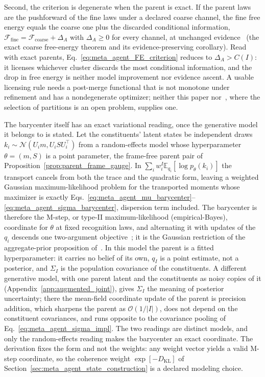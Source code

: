 \documentclass[11pt]{article}
\begin{document}
Second, the criterion is degenerate when the parent is exact. If the parent laws are the pushforward of the fine laws under a declared coarse channel, the fine free energy equals the coarse one plus the discarded conditional information, $\mathcal{F}_{\mathrm{fine}} = \mathcal{F}_{\mathrm{coarse}} + \Delta_A$ with $\Delta_A \ge 0$ for every channel, at unchanged evidence~\cite[Ch.~9]{DennisGaugeVFE2026} (the exact coarse free-energy theorem and its evidence-preserving corollary). Read with exact parents, Eq.~\eqref{eq:meta_agent_FE_criterion} reduces to $\Delta_A > C(I)$: it licenses whichever cluster discards the most conditional information, and the drop in free energy is neither model improvement nor evidence ascent. A usable licensing rule needs a post-merge functional that is not monotone under refinement and has a nondegenerate optimizer; neither this paper nor~\cite[Ch.~9]{DennisGaugeVFE2026}, where the selection of partitions is an open problem, supplies one.

The barycenter itself has an exact variational reading, once the generative model it belongs to is stated. Let the constituents' latent states be independent draws $k_i \sim \mathcal{N}(U_i m, U_i S U_i^\top)$ from a random-effects model whose hyperparameter $\theta = (m, S)$ is a point parameter, the frame-free parent pair of Proposition~\ref{prop:parent_frame_gauge}. In $\sum_i w_i^I \mathbb{E}_{q_i}[\log p_\theta(k_i)]$ the transport cancels from both the trace and the quadratic form, leaving a weighted Gaussian maximum-likelihood problem for the transported moments whose maximizer is exactly Eqs.~\eqref{eq:meta_agent_mu_barycenter}--\eqref{eq:meta_agent_sigma_barycenter}, dispersion term included. The barycenter is therefore the M-step, or type-II maximum-likelihood (empirical-Bayes), coordinate for $\theta$ at fixed recognition laws, and alternating it with updates of the $q_i$ descends one two-argument objective~\cite{Neal1998}; it is the Gaussian restriction of the aggregate-prior proposition of~\cite[Ch.~12]{DennisGaugeVFE2026}. In this model the parent is a fitted hyperparameter: it carries no belief of its own, $q_I$ is a point estimate, not a posterior, and $\Sigma_I$ is the population covariance of the constituents. A different generative model, with one parent latent and the constituents as noisy copies of it (Appendix~\ref{app:augmented_joint}), gives $\Sigma_I$ the meaning of posterior uncertainty; there the mean-field coordinate update of the parent is precision addition, which sharpens the parent as $\mathcal{O}(1/|I|)$, does not depend on the constituent covariances, and runs opposite to the covariance pooling of Eq.~\eqref{eq:meta_agent_sigma_impl}. The two readings are distinct models, and only the random-effects reading makes the barycenter an exact coordinate. The derivation fixes the form and not the weights: any weight vector yields a valid M-step coordinate, so the coherence weight $\exp[-D_{\mathrm{KL}}]$ of Section~\ref{sec:meta_agent_state_construction} is a declared modeling choice.
\end{document}
